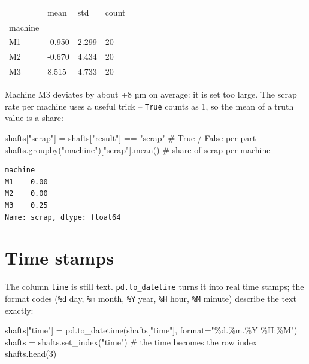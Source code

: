 \documentclass[
  letterpaper,
  DIV=11,
  numbers=noendperiod]{scrreprt}
\newenvironment{Shaded}{\begin{snugshade}}{\end{snugshade}}
\newcommand{\BuiltInTok}[1]{\textcolor[rgb]{0.00,0.23,0.31}{#1}}
\newcommand{\CommentTok}[1]{\textcolor[rgb]{0.37,0.37,0.37}{#1}}
\newcommand{\DecValTok}[1]{\textcolor[rgb]{0.68,0.00,0.00}{#1}}
\newcommand{\NormalTok}[1]{\textcolor[rgb]{0.00,0.23,0.31}{#1}}
\newcommand{\OperatorTok}[1]{\textcolor[rgb]{0.37,0.37,0.37}{#1}}
\newcommand{\SpecialCharTok}[1]{\textcolor[rgb]{0.37,0.37,0.37}{#1}}
\newcommand{\StringTok}[1]{\textcolor[rgb]{0.13,0.47,0.30}{#1}}
\begin{document}
\begin{longtable}[]{@{}llll@{}}
\toprule\noalign{}
& mean & std & count \\
machine & & & \\
\midrule\noalign{}
\endhead
\bottomrule\noalign{}
\endlastfoot
M1 & -0.950 & 2.299 & 20 \\
M2 & -0.670 & 4.434 & 20 \\
M3 & 8.515 & 4.733 & 20 \\
\end{longtable}

Machine M3 deviates by about +8 µm on average: it is set too large. The
scrap rate per machine uses a useful trick -- \texttt{True} counts as 1,
so the mean of a truth value is a share:

\begin{Shaded}
\begin{Highlighting}[]
\NormalTok{shafts[}\StringTok{"scrap"}\NormalTok{] }\OperatorTok{=}\NormalTok{ shafts[}\StringTok{"result"}\NormalTok{] }\OperatorTok{==} \StringTok{"scrap"}         \CommentTok{\# True / False per part}
\NormalTok{shafts.groupby(}\StringTok{"machine"}\NormalTok{)[}\StringTok{"scrap"}\NormalTok{].mean()             }\CommentTok{\# share of scrap per machine}
\end{Highlighting}
\end{Shaded}

\begin{verbatim}
machine
M1    0.00
M2    0.00
M3    0.25
Name: scrap, dtype: float64
\end{verbatim}

\section*{Time stamps}\label{time-stamps}


The column \texttt{time} is still text. \texttt{pd.to\_datetime} turns
it into real time stamps; the format codes (\texttt{\%d} day,
\texttt{\%m} month, \texttt{\%Y} year, \texttt{\%H} hour, \texttt{\%M}
minute) describe the text exactly:

\begin{Shaded}
\begin{Highlighting}[]
\NormalTok{shafts[}\StringTok{"time"}\NormalTok{] }\OperatorTok{=}\NormalTok{ pd.to\_datetime(shafts[}\StringTok{"time"}\NormalTok{], }\BuiltInTok{format}\OperatorTok{=}\StringTok{"}\SpecialCharTok{\%d}\StringTok{.\%m.\%Y \%H:\%M"}\NormalTok{)}
\NormalTok{shafts }\OperatorTok{=}\NormalTok{ shafts.set\_index(}\StringTok{"time"}\NormalTok{)                     }\CommentTok{\# the time becomes the row index}
\NormalTok{shafts.head(}\DecValTok{3}\NormalTok{)}
\end{Highlighting}
\end{Shaded}
\end{document}
